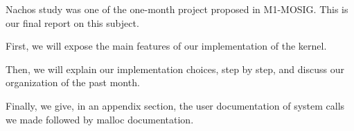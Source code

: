 Nachos study was one of the one-month project proposed in M1-MOSIG. This is our
final report on this subject.

First, we will expose the main features of our implementation of the kernel.

Then, we will explain our implementation choices, step by step, and discuss our
organization of the past month.

Finally, we give, in an appendix section, the user documentation of system
calls we made followed by malloc documentation.

